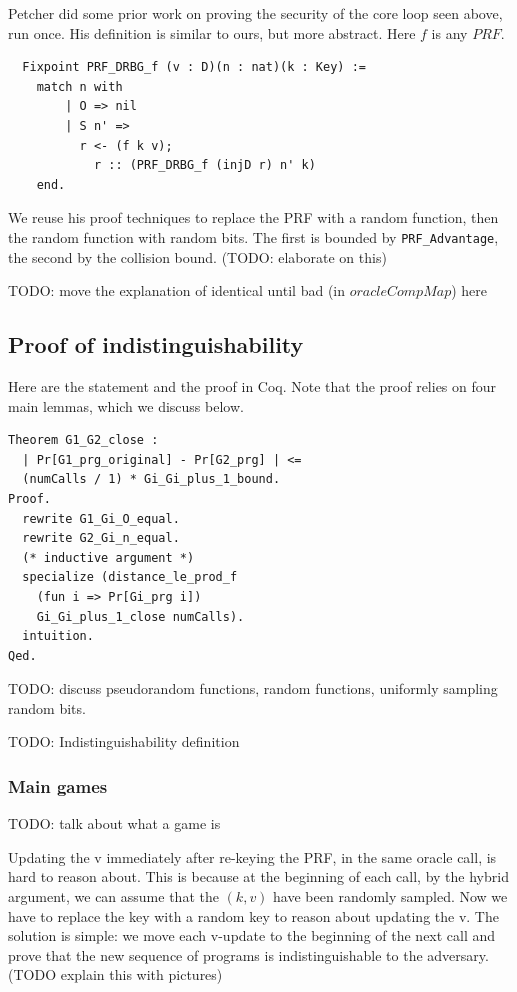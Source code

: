 \documentclass[12pt,lot, lof]{puthesis}
\newcommand{\li} {\lstinline}
\begin{document}
{Petcher did some prior work on proving the security of the core loop seen above, run once. His definition is similar to ours, but more abstract. Here $f$ is any $PRF$.

\begin{lstlisting}
  Fixpoint PRF_DRBG_f (v : D)(n : nat)(k : Key) :=
    match n with
        | O => nil
        | S n' => 
          r <- (f k v);
            r :: (PRF_DRBG_f (injD r) n' k)
    end.
\end{lstlisting}

We reuse his proof techniques to replace the PRF with a random function, then the random function with random bits. The first is bounded by \li|PRF_Advantage|, the second by the collision bound. (TODO: elaborate on this)

TODO: move the explanation of identical until bad (in $oracleCompMap$) here

\subsection{Proof of indistinguishability}

Here are the statement and the proof in Coq. Note that the proof relies on four main lemmas, which we discuss below.

\begin{lstlisting}
Theorem G1_G2_close :
  | Pr[G1_prg_original] - Pr[G2_prg] | <= 
  (numCalls / 1) * Gi_Gi_plus_1_bound.
Proof.
  rewrite G1_Gi_O_equal.
  rewrite G2_Gi_n_equal.
  (* inductive argument *)
  specialize (distance_le_prod_f 
  	(fun i => Pr[Gi_prg i]) 
	Gi_Gi_plus_1_close numCalls).
  intuition.
Qed.
\end{lstlisting}

TODO: discuss pseudorandom functions, random functions, uniformly sampling random bits.

TODO: Indistinguishability definition

\subsubsection{Main games}

TODO: talk about what a game is

Updating the v immediately after re-keying the PRF, in the same oracle call, is hard to reason about. This is because at the beginning of each call, by the hybrid argument, we can assume that the $(k,v)$ have been randomly sampled. Now we have to replace the key with a random key to reason about updating the v. The solution is simple: we move each v-update to the beginning of the next call and prove that the new sequence of programs is indistinguishable to the adversary. (TODO explain this with pictures)

}
\end{document}
